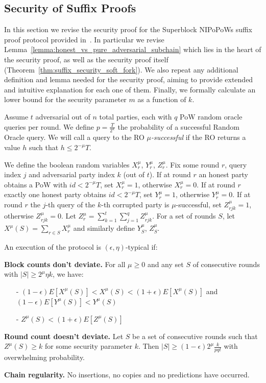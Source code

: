 \subsection{Security of Suffix Proofs} \label{proof_under_hard_fork}
In this section we revise the security proof for the Superblock NIPoPoWs suffix proof protocol provided in~\cite{nipopows}. In particular we revise Lemma~\ref{lemma:honest_vs_pure_adversarial_subchain} which lies in the heart of the security proof, as well as the security proof itself (Theorem~\ref{thm:suffix_security_soft_fork}). We also repeat any additional
definition and lemma needed for the security proof, aiming to provide extended and intuitive explanation for each one of them. Finally, we formally calculate an lower bound for the security parameter $m$ as a function of $k$.

Assume $t$ adversarial out of $n$ total parties, each with $q$ PoW random oracle
queries per round. We define $p = \frac{T}{2^\kappa}$ the probability of a
successful Random Oracle query. We will call a query to the RO $\mu$\textit{-successful}
if the RO returns a value $h$ such that $h \leq 2^{-\mu}T$.

We define the boolean random variables $X_r^{\mu}$, $Y_r^{\mu}$, $Z_r^{\mu}$.
Fix some round $r$, query index $j$ and adversarial party index $k$ (out of $t$).
If at round $r$ an honest party obtains a PoW with $id < 2^{-\mu}T$, set $X_r^{\mu} = 1$,
otherwise $X_r^{\mu} = 0$. If at round $r$ exactly one honest party obtains
$id < 2^{-\mu}T$, set $Y_r^{\mu} = 1$, otherwise $Y_r^{\mu} = 0$. If at round $
r$ the $j$-th query of the $k$-th corrupted party is $\mu$-successful, set
$Z_{rjk}^{\mu} = 1$, otherwise $Z_{rjk}^{\mu} = 0$. Let $Z_r^{\mu} =
\sum_{k=1}^t\sum_{j=1}^qZ_{rjk}^{\mu}$. For a set of rounds $S$, let
$X^\mu(S) = \sum_{r \in S}X^{\mu}_r$ and similarly define $Y_S^{\mu}$, $Z_S^{\mu}$.\\

\begin{defn}
	An execution of the protocol is $(\epsilon, \eta)$-typical if:
	
	\textbf{Block counts don't deviate.} For all $\mu \geq 0$ and any set
	$S$ of consecutive rounds with $\vert S \vert \geq 2^\mu \eta k$, we have:
	\begin{itemize}
		\item[-] $(1-\epsilon)E[X^\mu(S)] < X^\mu(S) < (1+\epsilon)E[X^\mu(S)] $ and
			$(1-\epsilon)E[Y^\mu(S)] < Y^\mu(S)$
		\item[-] $Z^\mu(S) < (1+\epsilon)E[Z^\mu(S)]$
\end{itemize}

	\textbf{Round count doesn't deviate.} Let $S$ be a set of consecutive rounds
	such that $Z^\mu(S) \geq k$ for some security parameter $k$. Then $\vert S \vert
	\geq (1-\epsilon)2^\mu \frac{k}{pqt}$ with overwhelming probability.
	
	\textbf{Chain regularity.} No insertions, no copies and no predictions
	\cite{backbone} have occurred.
	\label{defn:typical_execution}
\end{defn}

